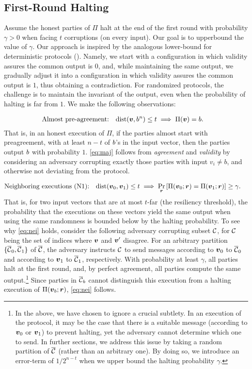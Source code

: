 \subsection{First-Round Halting}\label{sec:technique:1}
Assume the honest parties of $\Pi$ halt at the end of the first round with probability $\gamma>0$ when facing $t$ corruptions (on every input).
Our goal is to upperbound the value of $\gamma$. Our approach is inspired by the analogous lower-bound for deterministic protocols (\cf \cite{FL82,DS83}). Namely, we start with a configuration in which validity assures the common output is $0$, and, while maintaining the same output, we gradually adjust it into a configuration in which validity assures the common output is $1$, thus obtaining a contradiction. For randomized protocols, the challenge is to maintain the invariant of the output, even when the probability of halting is far from $1$. We make the following observations:

\begin{align} \label{eq:maj}
&\text{Almost pre-agreement:} \quad \mathrm{dist}({ \boldsymbol{v}},b^n) \le t \implies \Pi({ \boldsymbol{v}})=b.
\end{align}
That is, in an honest execution of $\Pi$, if the parties almost start with preagreement, \ie with at least $n-t$ of $b$'s in the input vector,
then the parties output $b$ with probability $1$. \cref{eq:maj} follows from \emph{agreement} and \emph{validity} by considering an adversary corrupting exactly those parties with input $v_i\neq b$, and otherwise not deviating from the protocol.


\begin{align}\label{eq:nei}
&\text{Neighboring executions (N1):} \quad \mathrm{dist}({ \boldsymbol{v}}_0,{ \boldsymbol{v}}_1)\le t \implies \Pr_{{ \boldsymbol{r}}}\left[\Pi({ \boldsymbol{v}}_0;{ \boldsymbol{r}})=\Pi({ \boldsymbol{v}}_1;{ \boldsymbol{r}})\right]\ge \gamma.
\end{align}
That is, for two input vectors that are at most $t$-far (\ie the resiliency threshold), the probability that the executions on these vectors yield the same output when using the same randomness is bounded below by the halting probability. To see why \cref{eq:nei} holds, consider the following adversary corrupting subset $\mathcal{C}$, for $\mathcal{C}$ being the set of indices where ${ \boldsymbol{v}}$ and ${ \boldsymbol{v}}'$ disagree. For an arbitrary partition $\{\overline{\mathcal{C}}_0,\overline{\mathcal{C}}_1\}$ of $\overline{\mathcal{C}}$, the adversary instructs $\mathcal{C}$ to send messages according to ${ \boldsymbol{v}}_0$ to $\overline{\mathcal{C}}_0$ and according to ${ \boldsymbol{v}}_1$ to $\overline{\mathcal{C}}_1$, respectively. With probability at least $\gamma$, all parties halt at the first round, and, by perfect agreement, all parties compute the same output.\footnote{In the above, we have chosen to ignore a crucial subtlety. In an execution of the protocol, it may be the case that there is a suitable message (according to ${ \boldsymbol{v}}_0$ or ${ \boldsymbol{v}}_1$) to prevent halting, yet the adversary cannot determine which one to send. In further sections, we address this issue by taking a random partition of $\overline{\mathcal{C}}$ (rather than an arbitrary one). By doing so, we introduce an error-term of $1/2^{n-t}$ when we upper bound the halting probability $\gamma$.} Since parties in $\overline{\mathcal{C}}_b$ cannot distinguish this execution from a halting execution of $\Pi({ \boldsymbol{v}}_b;{ \boldsymbol{r}})$, \cref{eq:nei} follows.


